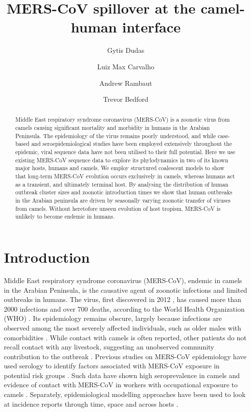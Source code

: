 \documentclass[9pt,lineno]{elife}
\title{\vspace{1.0cm} \LARGE \bf MERS-CoV spillover at the camel-human interface}
\author[1*]{Gytis Dudas}
\author[2]{Luiz Max Carvalho}
\author[2,3]{Andrew Rambaut}
\author[1]{Trevor Bedford}
\affil[1]{Vaccine and Infectious Disease Division, Fred Hutchinson Cancer Research Center, Seattle, WA, USA}
\affil[2]{Institute of Evolutionary Biology, University of Edinburgh, Edinburgh, UK}
\affil[3]{Fogarty International Center, National Institutes of Health, Bethesda, MD, USA}
\begin{document}
\maketitle

\begin{abstract}

Middle East respiratory syndrome coronavirus (MERS-CoV) is a zoonotic virus from camels causing significant mortality and morbidity in humans in the Arabian Peninsula.
The epidemiology of the virus remains poorly understood, and while case-based and seroepidemiological studies have been employed extensively throughout the epidemic, viral sequence data have not been utilised to their full potential.
Here we use existing MERS-CoV sequence data to explore its phylodynamics in two of its known major hosts, humans and camels.
We employ structured coalescent models to show that long-term MERS-CoV evolution occurs exclusively in camels, whereas humans act as a transient, and ultimately terminal host.
By analysing the distribution of human outbreak cluster sizes and zoonotic introduction times we show that human outbreaks in the Arabian peninsula are driven by seasonally varying zoonotic transfer of viruses from camels.
Without heretofore unseen evolution of host tropism, MERS-CoV is unlikely to become endemic in humans.

\end{abstract}

\pagebreak

\section*{Introduction}
Middle East respiratory syndrome coronavirus (MERS-CoV), endemic in camels in the Arabian Peninsula, is the causative agent of zoonotic infections and limited outbreaks in humans.
The virus, first discovered in 2012 \citep{zaki_isolation_2012,boheemen_genomic_2012}, has caused more than 2000  infections and over 700 deaths, according to the World Health Organization (WHO) \citep{who_mers_summary_2017}.
Its epidemiology remains obscure, largely because infections are observed among the most severely affected individuals, such as older males with comorbidities \citep{assiri_2013,group_state_2013}.
While contact with camels is often reported, other patients do not recall contact with any livestock, suggesting an unobserved community contribution to the outbreak \citep{group_state_2013}.
Previous studies on MERS-CoV epidemiology have used serology to identify factors associated with MERS-CoV exposure in potential risk groups \citep{reusken_occupational_2015,reusken_2013}.
Such data have shown high seroprevalence in camels \citep{muller_2014,corman_antibodies_2014,chu_2014,reusken_2013,reusken_2014} and evidence of contact with MERS-CoV in workers with occupational exposure to camels \citep{reusken_occupational_2015,muller_presence_2015}.
Separately, epidemiological modelling approaches have been used to look at incidence reports through time, space and across hosts \citep{cauchemez_unraveling_2016}.
\end{document}
